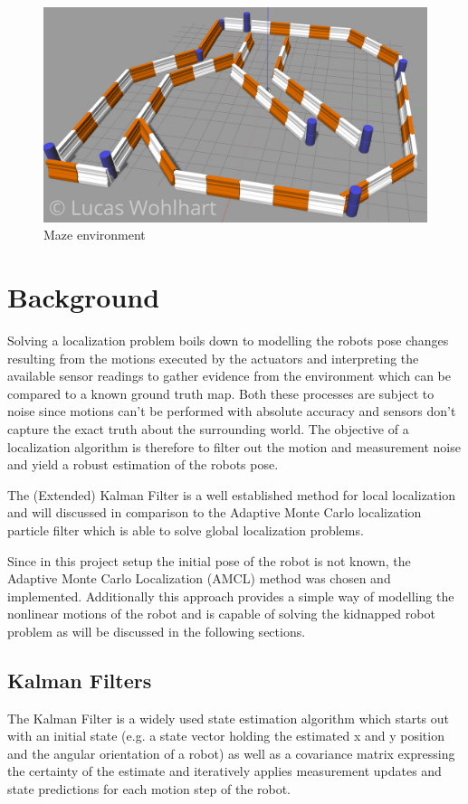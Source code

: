 \documentclass[10pt,journal,compsoc]{IEEEtran}
\begin{document}
\begin{figure}[thpb]
      \centering
      \includegraphics[width=\linewidth]{img/maze_world}
      \caption{Maze environment}
      \label{fig:maze}
\end{figure}



\section{Background}
Solving a localization problem boils down to modelling the robots pose changes resulting from the motions executed by the actuators and interpreting the available sensor readings to gather evidence from the environment which can be compared to a known ground truth map.
Both these processes are subject to noise since motions can't be performed with absolute accuracy and sensors don't capture the exact truth about the surrounding world.
The objective of a localization algorithm is therefore to filter out the motion and measurement noise and yield a robust estimation of the robots pose. 

The (Extended) Kalman Filter is a well established method for local localization and will discussed in comparison to the Adaptive Monte Carlo localization particle filter which is able to solve global localization problems.

Since in this project setup the initial pose of the robot is not known, the Adaptive Monte Carlo Localization (AMCL) method was chosen and implemented. Additionally this approach provides a simple way of modelling the nonlinear motions of the robot and is capable of solving the kidnapped robot problem as will be discussed in the following sections.

\subsection{Kalman Filters}
The Kalman Filter is a widely used state estimation algorithm which starts out with an initial state (e.g. a state vector holding the estimated x and y position and the angular orientation of a robot) as well as a covariance matrix expressing the certainty of the estimate and iteratively applies measurement updates and state predictions for each motion step of the robot.
\end{document}
